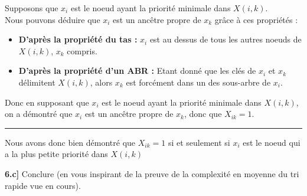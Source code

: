\documentclass[a4paper,12pt]{report}
\begin{document}
\begin{tcolorbox}[colback=gray!10, colframe=blue!30, coltitle=black, title=Réponse à la 6.b - 1/1]
    Supposons que \( x_i \) est le noeud ayant la priorité minimale dans \( X(i,k) \).\\

    Nous pouvons déduire que \( x_i \) est un ancêtre propre de \( x_k \) grâce à ces propriétés :\\[-0.4cm]
    \begin{itemize}
        \item \textbf{D'après la propriété du tas :} \( x_i \) est au dessus de tous les autres noeuds de \( X(i,k) \), \( x_k \) compris.
        \item \textbf{D'après la propriété d'un ABR :} Etant donné que les clés de \( x_i \) et \( x_k \) délimitent \( X(i,k) \), alors \( x_k \) est 
            forcément dans un des sous-arbre de \( x_i \).
    \end{itemize}

    \vspace{0.5cm}

    Donc en supposant que \( x_i \) est le noeud ayant la priorité minimale dans \( X(i,k) \), on a démontré que \( x_i \) est un ancêtre propre de \( x_k \),
        donc que \( X_{ik} = 1\).

    \vspace{0.5cm}
    \hrule
    \vspace{0.5cm}

    Nous avons donc bien démontré que \( X_{ik} = 1 \) si et seulement si \( x_i \) est le noeud qui a la plus petite priorité dans \( X(i,k) \)

\end{tcolorbox}




\newpage
{}

\textbf{6.c]} Conclure (en vous inspirant de la preuve de la complexité en moyenne du tri rapide vue en cours).
\end{document}
